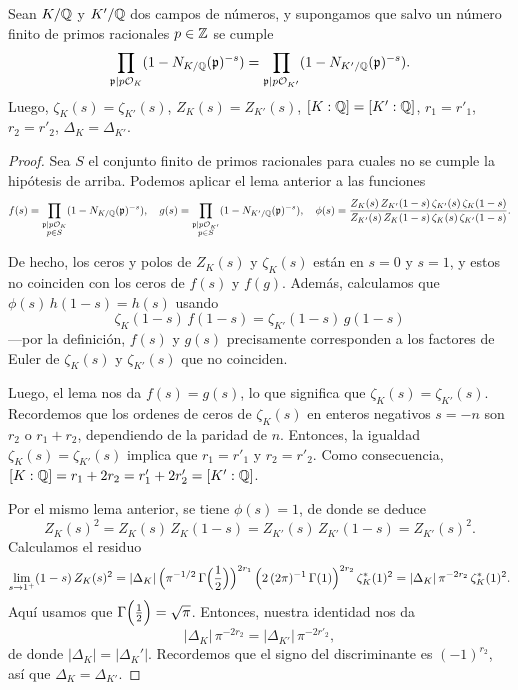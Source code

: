 \begin{proposicion}
  Sean $K/\mathbb{Q}$ y $K'/\mathbb{Q}$ dos campos de números, y supongamos que salvo un
  número finito de primos racionales $p \in \mathbb{Z}$ se cumple
  \[ \prod_{\mathfrak{p} \mid p\mathcal{O}_K} (1 - N_{K/\mathbb{Q}} (\mathfrak{p})^{-s}) =
    \prod_{\mathfrak{p} \mid p\mathcal{O}_{K'}} (1 - N_{K'/\mathbb{Q}} (\mathfrak{p})^{-s}). \]
  Luego, $\zeta_K (s) = \zeta_{K'} (s)$, $Z_K (s) = Z_{K'} (s)$,
  $[K:\mathbb{Q}] = [K':\mathbb{Q}]$, $r_1 = r'_1$, $r_2 = r'_2$, $\Delta_K = \Delta_{K'}$.

  \begin{proof}
    Sea $S$ el conjunto finito de primos racionales para cuales no se cumple la
    hipótesis de arriba. Podemos aplicar el lema anterior a las funciones
    \[ f (s) = \prod_{\substack{\mathfrak{p} \mid p\mathcal{O}_K \\ p\in S}} (1 - N_{K/\mathbb{Q}} (\mathfrak{p})^{-s}), \quad
      g (s) = \prod_{\substack{\mathfrak{p} \mid p\mathcal{O}_{K'} \\ p\in S}} (1 - N_{K'/\mathbb{Q}} (\mathfrak{p})^{-s}), \quad
      \phi (s) = \frac{Z_K (s) \, Z_{K'} (1-s) \, \zeta_{K'} (s) \, \zeta_K (1-s)}{Z_{K'} (s) \, Z_K (1-s) \, \zeta_K (s) \, \zeta_{K'} (1-s)}. \]

    De hecho, los ceros y polos de $Z_K (s)$ y $\zeta_K (s)$ están en $s = 0$ y
    $s = 1$, y estos no coinciden con los ceros de $f (s)$ y $f (g)$. Además,
    calculamos que $\phi (s)\,h (1-s) = h (s)$ usando
    $$\zeta_K (1-s)\,f (1-s) = \zeta_{K'} (1-s)\,g (1-s)$$
    ---por la definición, $f(s)$ y $g(s)$ precisamente corresponden a los
    factores de Euler de $\zeta_K (s)$ y $\zeta_{K'} (s)$ que no coinciden.

    Luego, el lema nos da $f (s) = g (s)$, lo que significa que
    $\zeta_K (s) = \zeta_{K'} (s)$. Recordemos que los ordenes de ceros
    de $\zeta_K (s)$ en enteros negativos $s = -n$ son $r_2$ o $r_1 + r_2$,
    dependiendo de la paridad de $n$. Entonces, la igualdad
    $\zeta_K (s) = \zeta_{K'} (s)$ implica que $r_1 = r'_1$ y $r_2 = r'_2$.
    Como consecuencia, $[K:\mathbb{Q}] = r_1 + 2 r_2 = r'_1 + 2 r'_2 = [K':\mathbb{Q}]$.

    Por el mismo lema anterior, se tiene $\phi (s) = 1$, de donde se deduce
    $$Z_K (s)^2 = Z_K (s)\,Z_K (1-s) = Z_{K'} (s)\,Z_{K'} (1-s) = Z_{K'} (s)^2.$$
    Calculamos el residuo
    \[ \lim_{s\to 1^+} (1-s)\,Z_K (s)^2 =
      |\Delta_K|\,\Bigl(\pi^{-1/2}\,\Gamma \Bigl(\frac{1}{2}\Bigr)\Bigr)^{2r_1}\,\Bigl(2\,(2\pi)^{-1}\,\Gamma (1)\Bigr)^{2r_2}\,\zeta_K^* (1)^2 =
      |\Delta_K|\,\pi^{-2r_2}\,\zeta_K^* (1)^2. \]
    Aquí usamos que $\Gamma \Bigl(\frac{1}{2}\Bigr) = \sqrt{\pi}$. Entonces,
    nuestra identidad nos da
    $$|\Delta_K|\,\pi^{-2r_2} = |\Delta_{K'}|\,\pi^{-2r'_2},$$
    de donde $|\Delta_K| = |\Delta_K'|$. Recordemos que el signo del
    discriminante es $(-1)^{r_2}$, así que $\Delta_K = \Delta_{K'}$.
  \end{proof}
\end{proposicion}

